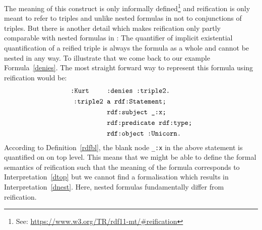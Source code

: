 The meaning of this construct is only informally defined\footnote{See: \url{https://www.w3.org/TR/rdf11-mt/\#reification}} and \rdf reification is only meant to refer to triples and unlike nested formulas in \nthree 
not to conjunctions of triples. But there is another detail which makes \rdf reification only partly comparable with nested formulas in \nthree: The quantifier of implicit existential quantification of a reified triple 
is always the formula as a whole and cannot be nested in any way. To illustrate that we come back to our example Formula~\ref{denies}. The most straight forward way to represent this formula using reification would be:
\begin{equation}
 \begin{split}
 \texttt{:Kurt }\hspace{0.7cm} & \texttt{:denies :triple2.}\\
  \texttt{ :triple2 } & \texttt{a rdf:Statement;}\\
&\texttt{rdf:subject \_:x;}\\
&\texttt{rdf:predicate rdf:type;}\\
&\texttt{rdf:object :Unicorn.}
 \end{split}
\end{equation}
According to Definition~\ref{rdfbl}, the blank node \texttt{\_:x} in the above statement is quantified on on top level. 
This means that we might be able to define the formal semantics of \rdf reification  
such that the meaning of the formula 
corresponds to Interpretation~\ref{dtop} but we cannot find a formalisation which results in Interpretation~\ref{dnest}. Here, nested \nthree formulas fundamentally differ from \rdf reification.


% 

